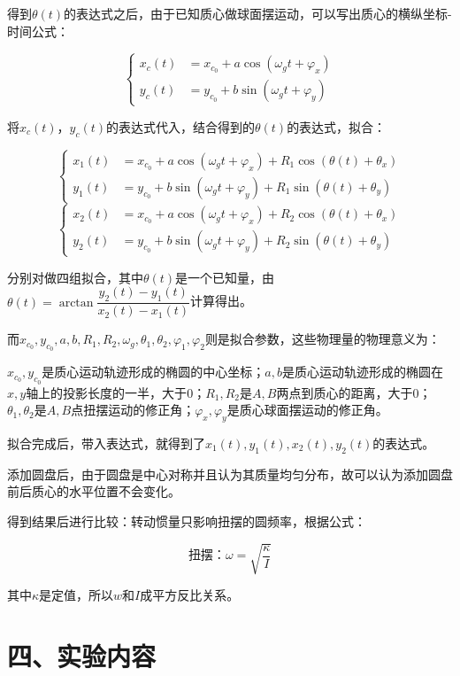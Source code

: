 \documentclass[11pt]{article}
\begin{document}
得到$\theta(t)$的表达式之后，由于已知质心做球面摆运动，可以写出质心的横纵坐标-时间公式：

$$\left\{
\begin{aligned}
    x_c(t)&=x_{c_0}+a\cos(\omega_{g}t+\varphi_x) \\
    y_c(t)&=y_{c_0}+b\sin(\omega_{g}t+\varphi_y)
\end{aligned}
\right.$$

将$x_c(t)，y_c(t)$的表达式代入，结合得到的$\theta(t)$的表达式，拟合：

$$\left\{
\begin{aligned}
    x_1(t)&=x_{c_0}+a\cos(\omega_{g}t+\varphi_x)+R_1\cos(\theta(t)+\theta_x) \\
    y_1(t)&=y_{c_0}+b\sin(\omega_{g}t+\varphi_y)+R_1\sin(\theta(t)+\theta_y)
\end{aligned}
\right.$$
$$\left\{
\begin{aligned}
    x_2(t)&=x_{c_0}+a\cos(\omega_{g}t+\varphi_x)+R_2\cos(\theta(t)+\theta_x) \\
    y_2(t)&=y_{c_0}+b\sin(\omega_{g}t+\varphi_y)+R_2\sin(\theta(t)+\theta_y)
\end{aligned}
\right.$$

分别对做四组拟合，其中$\theta(t)$是一个已知量，由$\theta(t)=\arctan\dfrac{y_2(t)-y_1(t)}{x_2(t)-x_1(t)}$计算得出。

而$x_{c_0},y_{c_0},a,b,R_1,R_2,\omega_{g},\theta_1,\theta_2,\varphi_1,\varphi_2$则是拟合参数，这些物理量的物理意义为：

$x_{c_0},y_{c_0}$是质心运动轨迹形成的椭圆的中心坐标；$a,b$是质心运动轨迹形成的椭圆在$x,y$轴上的投影长度的一半，大于$0$；$R_1,R_2$是$A,B$两点到质心的距离，大于$0$；$\theta_1,\theta_2$是$A,B$点扭摆运动的修正角；$\varphi_x,\varphi_y$是质心球面摆运动的修正角。

拟合完成后，带入表达式，就得到了$x_1(t),y_1(t),x_2(t),y_2(t)$的表达式。

添加圆盘后，由于圆盘是中心对称并且认为其质量均匀分布，故可以认为添加圆盘前后质心的水平位置不会变化。

得到结果后进行比较：转动惯量只影响扭摆的圆频率，根据公式：

$$
\text{扭摆：}\omega=\sqrt{\dfrac{\kappa}{I}}
$$

其中$\kappa$是定值，所以$w$和$I$成平方反比关系。

\section*{四、实验内容}
\end{document}
